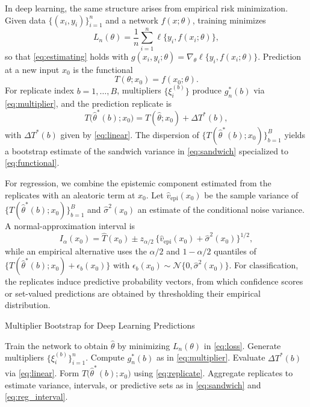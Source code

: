 \documentclass[12pt, titlepage, reqno]{article}
\begin{document}
In deep learning, the same structure arises from empirical risk
minimization. Given data $\{(x_i,y_i)\}_{i=1}^n$ and a network
$f(x;\theta)$, training minimizes
\begin{equation}
L_n(\theta)=\frac{1}{n}\sum_{i=1}^n
\ell\{y_i,f(x_i;\theta)\},
\label{eq:loss}
\end{equation}
so that \eqref{eq:estimating} holds with
$g(x_i,y_i;\theta)=\nabla_\theta \ell\{y_i,f(x_i;\theta)\}$. Prediction
at a new input $x_0$ is the functional
\begin{equation}
T(\theta;x_0)=f(x_0;\theta).
\label{eq:functional}
\end{equation}
For replicate index $b=1,\dots,B$, multipliers
$\{\xi_i^{(b)}\}$ produce $g_n^*(b)$ via \eqref{eq:multiplier}, and the
prediction replicate is
\begin{equation}
T\bigl(\hat{\theta}^*(b);x_0\bigr)
= T(\hat{\theta};x_0)+\Delta T^*(b),
\label{eq:replicate}
\end{equation}
with $\Delta T^*(b)$ given by \eqref{eq:linear}. The dispersion of
$\{T(\hat{\theta}^*(b);x_0)\}_{b=1}^B$ yields a bootstrap estimate of
the sandwich variance in \eqref{eq:sandwich} specialized to
\eqref{eq:functional}.


For regression, we combine the epistemic component estimated from the
replicates with an aleatoric term at $x_0$. Let
$\widehat{v}_{\mathrm{epi}}(x_0)$ be the sample variance of
$\{T(\hat{\theta}^*(b);x_0)\}_{b=1}^B$ and
$\hat{\sigma}^2(x_0)$ an estimate of the conditional noise variance.
A normal-approximation interval is
\begin{equation}
I_\alpha(x_0)=
\hat{T}(x_0)\pm z_{\alpha/2}\,
\bigl\{\widehat{v}_{\mathrm{epi}}(x_0)
+\hat{\sigma}^2(x_0)\bigr\}^{1/2},
\label{eq:reg_interval}
\end{equation}
while an empirical alternative uses the $\alpha/2$ and
$1-\alpha/2$ quantiles of
$\{T(\hat{\theta}^*(b);x_0)+\epsilon_b(x_0)\}$ with
$\epsilon_b(x_0)\sim \mathcal{N}\{0,\hat{\sigma}^2(x_0)\}$. For
classification, the replicates induce predictive probability vectors,
from which confidence scores or set-valued predictions are obtained by
thresholding their empirical distribution.

\begin{algorithm}[t]
\caption{Multiplier Bootstrap for Deep Learning Predictions}
\begin{algorithmic}[1]
\STATE Train the network to obtain $\hat{\theta}$ by minimizing
$L_n(\theta)$ in \eqref{eq:loss}.
  \STATE Generate multipliers $\{\xi_i^{(b)}\}_{i=1}^n$.
  \STATE Compute $g_n^*(b)$ as in \eqref{eq:multiplier}.
  \STATE Evaluate $\Delta T^*(b)$ via \eqref{eq:linear}.
  \STATE Form $T\bigl(\hat{\theta}^*(b);x_0\bigr)$ using
  \eqref{eq:replicate}.
\ENDFOR
\STATE Aggregate replicates to estimate variance, intervals, or
predictive sets as in \eqref{eq:sandwich} and \eqref{eq:reg_interval}.
\end{algorithmic}
\end{algorithm}
\end{document}
